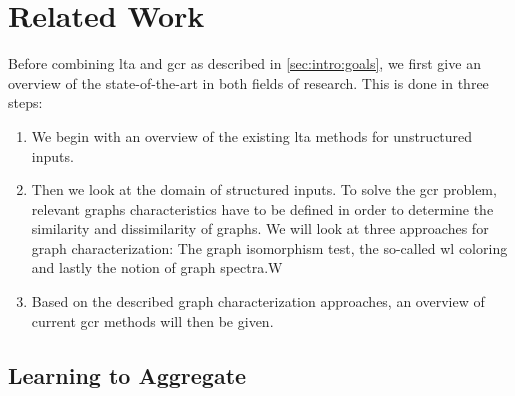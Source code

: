 \chapter{Related Work}%
\label{sec:related}

Before combining \ac{lta} and \ac{gcr} as described in \cref{sec:intro:goals}, we first give an overview of the state-of-the-art in both fields of research.
This is done in three steps:
\begin{enumerate}
	\item We begin with an overview of the existing \ac{lta} methods for unstructured inputs.
	\item Then we look at the domain of structured inputs.
		To solve the \ac{gcr} problem, relevant graphs characteristics have to be defined in order to determine the similarity and dissimilarity of graphs.
		We will look at three approaches for graph characterization: The graph isomorphism test, the so-called \acl{wl} coloring and lastly the notion of graph spectra.W
	\item Based on the described graph characterization approaches, an overview of current \ac{gcr} methods will then be given.
\end{enumerate}

\section{Learning to Aggregate}%
\label{sec:related:lta}

